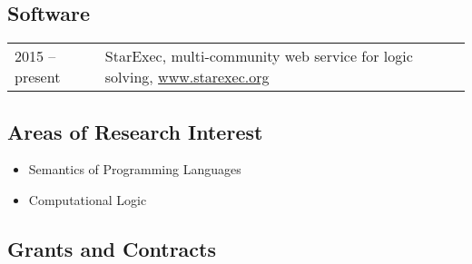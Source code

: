 \documentclass[10pt]{article}
\begin{document}
\printbibliography[title={\normalsize Reviews},
 keyword=review,
 resetnumbers=true
]



\subsection*{Software}
\smallskip

\begin{tabular}{l@{\quad\ }l} 
 2015 -- present
 & StarExec, multi-community web service for logic solving, \url{www.starexec.org}
\end{tabular}

\pagebreak
\begin{IOWA ONLY}
\subsection*{Areas of Research Interest}
\smallskip

\begin{itemize} \setlength{\itemsep}{0ex}
 \item [] Semantics of Programming Languages
 \item [] Computational Logic
\end{itemize}
\end{IOWA ONLY}

\subsection*{Grants and Contracts}
\smallskip
\end{document}
